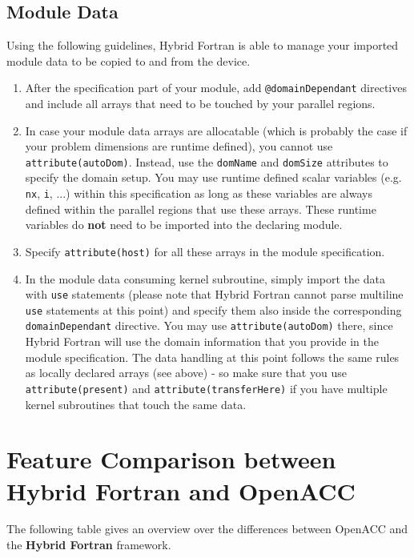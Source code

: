 \subsection{Module Data}
Using the following guidelines, Hybrid Fortran is able to manage your imported module data to be copied to and from the device.
\begin{enumerate}
 \item After the specification part of your module, add \verb|@domainDependant| directives and include all arrays that need to be touched by your parallel regions.
 \item In case your module data arrays are allocatable (which is probably the case if your problem dimensions are runtime defined), you cannot use \verb|attribute(autoDom)|. Instead, use the \verb|domName| and \verb|domSize| attributes to specify the domain setup. You may use runtime defined scalar variables (e.g. \verb|nx|, \verb|i|, ...) within this specification as long as these variables are always defined within the parallel regions that use these arrays. These runtime variables do \textbf{not} need to be imported into the declaring module.
 \item Specify \verb|attribute(host)| for all these arrays in the module specification.
 \item In the module data consuming kernel subroutine, simply import the data with \verb|use| statements (please note that Hybrid Fortran cannot parse multiline \verb|use| statements at this point) and specify them also inside the corresponding \verb|domainDependant| directive. You may use \verb|attribute(autoDom)| there, since Hybrid Fortran will use the domain information that you provide in the module specification. The data handling at this point follows the same rules as locally declared arrays (see above) - so make sure that you use \verb|attribute(present)| and \verb|attribute(transferHere)| if you have multiple kernel subroutines that touch the same data.
\end{enumerate}

\clearpage
\section{Feature Comparison between Hybrid Fortran and OpenACC} \label{sec:featureComparisonFrameworks}

The following table gives an overview over the differences between OpenACC and the \textbf{Hybrid Fortran} framework.

